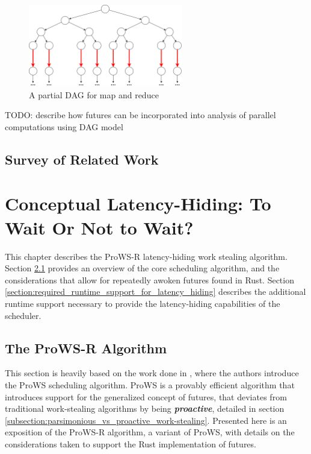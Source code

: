 \documentclass[bsc,frontabs,singlespacing,parskip,deptreport,normalheadings]{infthesis}
\begin{document}
\begin{figure}[ht]
    \centering
    \includegraphics[width=0.6\textwidth]{figures/map-reduce.png}
    \caption{A partial DAG for map and reduce}
    \label{fig:map-reduce-dag}
\end{figure}

TODO: describe how futures can be incorporated into analysis of parallel
computations using DAG model

\section{Survey of Related Work}


\chapter{Conceptual Latency-Hiding: To Wait Or Not to Wait?}
\label{chapter:conceptual_latency-hiding:_to_wait_or_not_to_wait?}

This chapter describes the ProWS-R latency-hiding work stealing algorithm.
Section \ref{section:overview_of_the_prows_algorithm} provides an overview of
the core scheduling algorithm, and the considerations that allow for repeatedly
awoken futures found in Rust. Section
\ref{section:required_runtime_support_for_latency_hiding} describes the
additional runtime support necessary to provide the latency-hiding capabilities
of the scheduler.

\section{The ProWS-R Algorithm}
\label{section:overview_of_the_prows_algorithm}

This section is heavily based on the work done in \cite{singer_proactive_2019},
where the authors introduce the ProWS scheduling algorithm. ProWS is a provably
efficient algorithm that introduces support for the generalized concept of
futures, that deviates from traditional work-stealing algorithms by being
\textit{\textbf{proactive}}, detailed in section 
\ref{subsection:parsimonious_vs_proactive_work-stealing}. Presented here is an
exposition of the ProWS-R algorithm, a variant of ProWS, with details on the
considerations taken to support the Rust implementation of futures.
\end{document}
